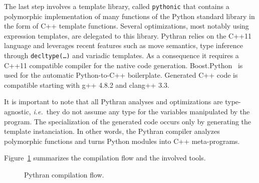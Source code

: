 \documentclass[10pt, onecolumn, preprint]{sigplanconf}
\providecommand{\ie}[1][~]{\textit{i.e.}#1}
\begin{document}
The last step involves a template library, called \texttt{pythonic} that 
contains a polymorphic implementation of many functions of the Python standard
library in the form of C++ template functions. Several optimizations, most
notably using expression templates, are delegated to this library. Pythran relies
on the C++11~\cite{isocxx11} language and leverages recent features such as
move semantics, type inference through \texttt{decltype(\dots)} and variadic
templates.
As a consequence it requires a C++11 compatible compiler for the native code
generation. Boost.Python~\cite{boostpython2007} is used for the automatic
Python-to-C++ boilerplate. Generated C++ code is compatible starting with g++ 
4.8.2 and clang++ 3.3.

It is important to note that all Pythran analyses and optimizations are
type-agnostic, \ie{they do not assume any type for the variables manipulated
by the program}. The specialization of the generated code occurs only by generating the template instanciation.
In other words, the Pythran compiler analyzes polymorphic functions and turns
Python modules into C++ meta-programs.

Figure~\ref{fig:pythran-compiler} summarizes the compilation flow and the 
involved tools.

\begin{figure}

    \centering
    
    \caption{Pythran compilation flow.}
    \label{fig:pythran-compiler}

\end{figure}
\end{document}
